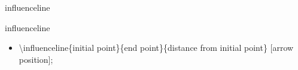 \documentclass[ aspectratio=169,  12pt,blue,xcolor=pdftex,dvipsnames,table,handout,notes]{beamer}
\begin{document}

		\begin{frame}[t]{influenceline}
 
			\begin{block}{influenceline}
			\begin{itemize}
			\item[] \textbackslash influenceline\{initial point\}\{end point\}\{distance from initial point\}
					[arrow position];
			\end{itemize}
			\end{block}



			\begin{example}
			\end{example}





		\end{frame}

\end{document}
